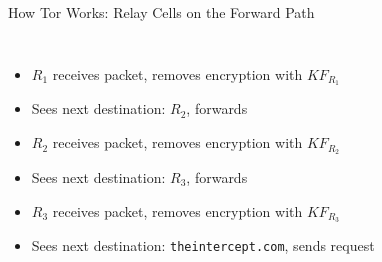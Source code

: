\documentclass[9pt,a4paper]{beamer}
\begin{document}
\begin{frame}{How Tor Works: Relay Cells on the Forward Path}
\begin{columns}
    \begin{itemize}
      \item $R_1$ receives packet, removes encryption with $KF_{R_1}$
      \item<2-> Sees next destination: $R_2$, forwards
      \item<3-> $R_2$ receives packet, removes encryption with $KF_{R_2}$
      \item<4-> Sees next destination: $R_3$, forwards
      \item<5-> $R_3$ receives packet, removes encryption with $KF_{R_3}$
      \item<6-> Sees next destination: \texttt{theintercept.com}, sends request
    \end{itemize}
  \end{columns}
\end{frame}
\end{document}
